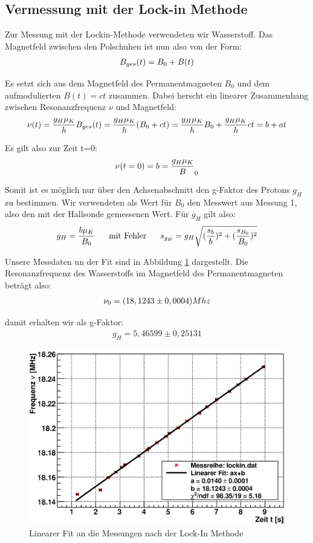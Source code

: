 \documentclass[12pt]{article}
\begin{document}
\subsection{Vermessung mit der Lock-in Methode}
Zur Messung mit der Lockin-Methode verwendeten wir Wasserstoff. Das Magnetfeld zwischen den Polschuhen ist nun also von der Form:
\begin{align}
 \notag B_{ges}(t)=B_0+B(t)
\end{align}

Es setzt sich aus dem Magnetfeld des Permanentmagneten $B_0$ und dem aufmodulierten $B(t)=c t$ zusammen. Dabei herscht ein linearer Zusammenhang zwischen Resonanzfrequenz $\nu$ und Magnetfeld:
\begin{align}
 \notag \nu(t)=\frac{g_H\mu_K}{h}B_{ges}(t)=\frac{g_H\mu_K}{h}(B_0+c t)=\frac{g_H\mu_K}{h}B_0 + \frac{g_H\mu_K}{h}c t= b+at
\end{align}

Es gilt also zur Zeit t=0:
\begin{align}
 \notag \nu(t=0) = b = \frac{g_H\mu_K} B_0
\end{align}

Somit ist es möglich nur über den Achsenabschnitt den g-Faktor des Protons $g_H$ zu bestimmen. Wir verwendeten als Wert für $B_0$ den Messwert aus Messung 1, also den mit der Hallsonde gemessenen Wert. Für $g_H$ gilt also:
\begin{align}
 \notag g_H=\frac{b \mu_K}{B_0}~~~~~\textnormal{mit Fehler}~~~~~s_{g_H}=g_H\sqrt{(\frac{s_b}{b})^2+(\frac{s_{B_0}}{B_0})^2}
\end{align}

Unsere Messdaten un der Fit sind in Abbildung \ref{lockin} dargestellt. Die Resonanzfrequenz des Wasserstoffs im Magnetfeld des Permanentmagneten beträgt also:
\begin{align}
 \notag \nu_0= (18,1243\pm0,0004)Mhz
\end{align}

damit erhalten wir als g-Faktor:
\begin{align}
 g_H= 5,46599 \pm 0,25131
\end{align}

\begin{figure}[H]
\centering
\includegraphics[width=0.9\linewidth]{pictures/lockin.eps}
\caption{Linearer Fit an die Messungen nach der Lock-In Methode}
\label{lockin}
\end{figure}
\end{document}
